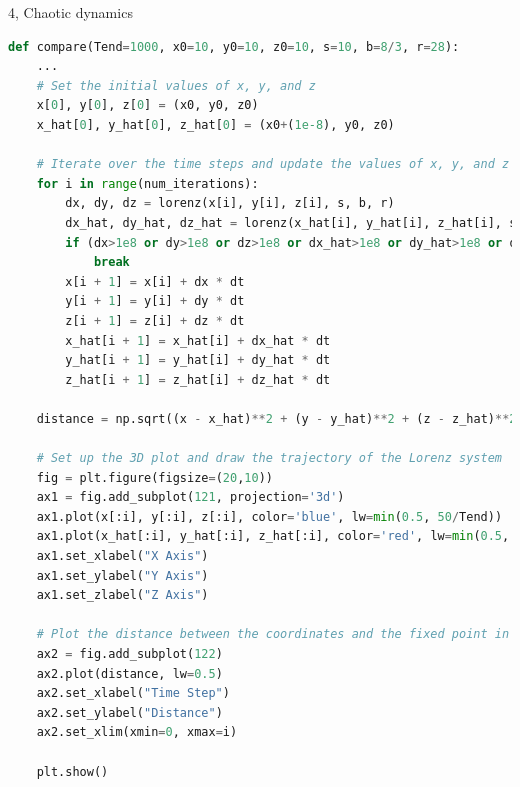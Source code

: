\documentclass[10pt,a4paper]{article}
\begin{document}
\begin{task}{4, Chaotic dynamics}
\begin{lstlisting}[language = Python,  label = {cusp_method}]
def compare(Tend=1000, x0=10, y0=10, z0=10, s=10, b=8/3, r=28):   
    ...
    # Set the initial values of x, y, and z
    x[0], y[0], z[0] = (x0, y0, z0)
    x_hat[0], y_hat[0], z_hat[0] = (x0+(1e-8), y0, z0)

    # Iterate over the time steps and update the values of x, y, and z using the Lorenz system equations
    for i in range(num_iterations):
        dx, dy, dz = lorenz(x[i], y[i], z[i], s, b, r)
        dx_hat, dy_hat, dz_hat = lorenz(x_hat[i], y_hat[i], z_hat[i], s, b, r)
        if (dx>1e8 or dy>1e8 or dz>1e8 or dx_hat>1e8 or dy_hat>1e8 or dz_hat>1e8):
            break
        x[i + 1] = x[i] + dx * dt
        y[i + 1] = y[i] + dy * dt
        z[i + 1] = z[i] + dz * dt
        x_hat[i + 1] = x_hat[i] + dx_hat * dt
        y_hat[i + 1] = y_hat[i] + dy_hat * dt
        z_hat[i + 1] = z_hat[i] + dz_hat * dt
    
    distance = np.sqrt((x - x_hat)**2 + (y - y_hat)**2 + (z - z_hat)**2)

    # Set up the 3D plot and draw the trajectory of the Lorenz system
    fig = plt.figure(figsize=(20,10))
    ax1 = fig.add_subplot(121, projection='3d')
    ax1.plot(x[:i], y[:i], z[:i], color='blue', lw=min(0.5, 50/Tend))
    ax1.plot(x_hat[:i], y_hat[:i], z_hat[:i], color='red', lw=min(0.5, 50/Tend))
    ax1.set_xlabel("X Axis")
    ax1.set_ylabel("Y Axis")
    ax1.set_zlabel("Z Axis")
    
    # Plot the distance between the coordinates and the fixed point in the second subplot
    ax2 = fig.add_subplot(122)
    ax2.plot(distance, lw=0.5)
    ax2.set_xlabel("Time Step")
    ax2.set_ylabel("Distance")
    ax2.set_xlim(xmin=0, xmax=i)
    
    plt.show()
\end{lstlisting}


\end{task}
\end{document}
